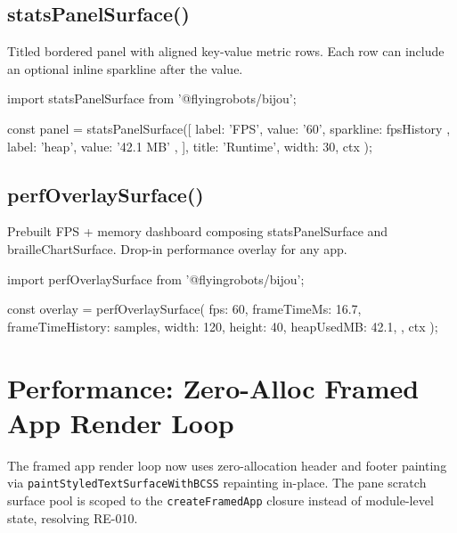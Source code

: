 \subsection{statsPanelSurface()}\label{record-278-statspanelsurface}

Titled bordered panel with aligned key-value metric rows. Each row can include an optional inline sparkline after the value.

\begin{CodeBlock}
import { statsPanelSurface } from '@flyingrobots/bijou';

const panel = statsPanelSurface([
  { label: 'FPS', value: '60', sparkline: fpsHistory },
  { label: 'heap', value: '42.1 MB' },
], { title: 'Runtime', width: 30, ctx });
\end{CodeBlock}

\subsection{perfOverlaySurface()}\label{record-278-perfoverlaysurface}

Prebuilt FPS + memory dashboard composing statsPanelSurface and brailleChartSurface. Drop-in performance overlay for any app.

\begin{CodeBlock}
import { perfOverlaySurface } from '@flyingrobots/bijou';

const overlay = perfOverlaySurface({
  fps: 60,
  frameTimeMs: 16.7,
  frameTimeHistory: samples,
  width: 120,
  height: 40,
  heapUsedMB: 42.1,
}, { ctx });
\end{CodeBlock}

\section{Performance: Zero-Alloc Framed App Render Loop}\label{record-278-performance-zero-alloc-framed-app-render-loop}

The framed app render loop now uses zero-allocation header and footer painting via \texttt{p\allowbreak{}a\allowbreak{}i\allowbreak{}n\allowbreak{}t\allowbreak{}S\allowbreak{}t\allowbreak{}y\allowbreak{}l\allowbreak{}e\allowbreak{}d\allowbreak{}T\allowbreak{}e\allowbreak{}x\allowbreak{}t\allowbreak{}S\allowbreak{}u\allowbreak{}r\allowbreak{}f\allowbreak{}a\allowbreak{}c\allowbreak{}e\allowbreak{}W\allowbreak{}i\allowbreak{}t\allowbreak{}h\allowbreak{}B\allowbreak{}C\allowbreak{}S\allowbreak{}S} repainting in-place. The pane scratch surface pool is scoped to the \texttt{c\allowbreak{}r\allowbreak{}e\allowbreak{}a\allowbreak{}t\allowbreak{}e\allowbreak{}F\allowbreak{}r\allowbreak{}a\allowbreak{}m\allowbreak{}e\allowbreak{}d\allowbreak{}A\allowbreak{}p\allowbreak{}p} closure instead of module-level state, resolving RE-010.

